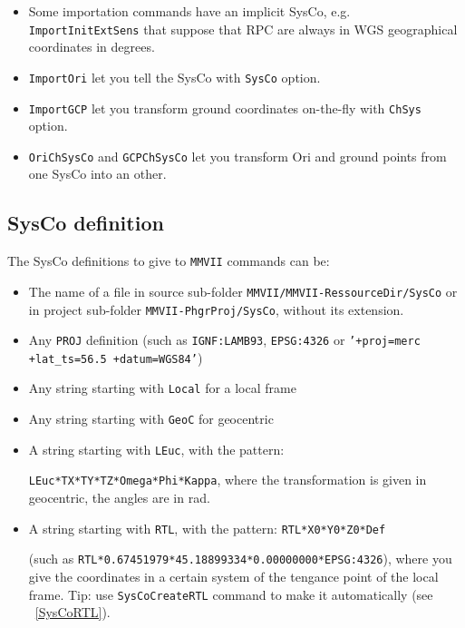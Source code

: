 \begin{itemize}
\item Some importation commands have an implicit SysCo, e.g. {\tt ImportInitExtSens} that suppose that RPC are always in WGS geographical coordinates in degrees.
\item {\tt ImportOri} let you tell the SysCo with {\tt SysCo} option.
\item {\tt ImportGCP} let you transform ground coordinates on-the-fly with {\tt ChSys} option.
\item {\tt OriChSysCo} and {\tt GCPChSysCo} let you transform Ori and ground points from one SysCo into an other.
\end{itemize}

\subsection{SysCo definition}
The SysCo definitions to give to {\tt MMVII} commands can be:
\begin{itemize}
\item The name of a file in source sub-folder {\tt MMVII/MMVII-RessourceDir/SysCo} or in project sub-folder {\tt MMVII-PhgrProj/SysCo}, without its extension.
\item Any {\tt PROJ} definition (such as {\tt IGNF:LAMB93}, {\tt EPSG:4326} or {\tt '+proj=merc +lat\_ts=56.5 +datum=WGS84'})
\item Any string starting with {\tt Local} for a local frame
\item Any string starting with {\tt GeoC} for geocentric
\item A string starting with {\tt LEuc}, with the pattern:

{\tt LEuc*TX*TY*TZ*Omega*Phi*Kappa}, where the transformation is given in geocentric, the angles are in rad.
\item A string starting with {\tt RTL}, with the pattern: {\tt RTL*X0*Y0*Z0*Def}

(such as {\tt RTL*0.67451979*45.18899334*0.00000000*EPSG:4326}),
where you give the coordinates in a certain system of the tengance point of the local frame. Tip: use {\tt SysCoCreateRTL} command to make it automatically (see ~\ref{SysCoRTL}).

\end{itemize}


